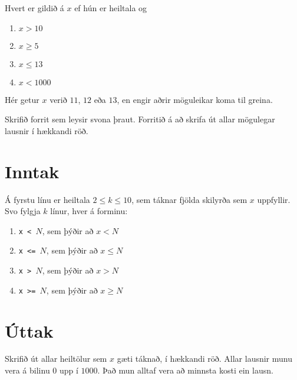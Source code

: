 

Hvert er gildið á $x$ ef hún er heiltala og
\begin{enumerate}
    \item $x > 10$
    \item $x \geq 5$
    \item $x \leq 13$
    \item $x < 1000$
\end{enumerate}
Hér getur $x$ verið $11$, $12$ eða $13$, en engir aðrir möguleikar koma til
greina.

Skrifið forrit sem leysir svona þraut. Forritið á að skrifa út allar mögulegar
lausnir í hækkandi röð.

\section*{Inntak}
Á fyrstu línu er heiltala $2 \leq k \leq 10$, sem táknar fjölda skilyrða sem
$x$ uppfyllir. Svo fylgja $k$ línur, hver á forminu:
\begin{enumerate}
    \item \texttt{x < $N$}, sem þýðir að $x < N$
    \item \texttt{x <= $N$}, sem þýðir að $x \leq N$
    \item \texttt{x > $N$}, sem þýðir að $x > N$
    \item \texttt{x >= $N$}, sem þýðir að $x \geq N$
\end{enumerate}

\section*{Úttak}
Skrifið út allar heiltölur sem $x$ gæti táknað, í hækkandi röð. Allar lausnir
munu vera á bilinu $0$ upp í $1000$. Það mun alltaf vera að minnsta kosti ein
lausn.

